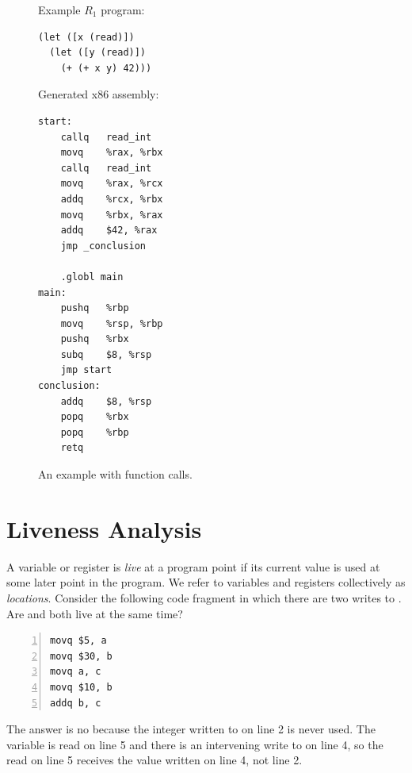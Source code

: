 \documentclass[11pt]{book}
\begin{document}
\begin{figure}[tp]
\begin{minipage}{0.45\textwidth}
Example $R_1$ program:
\begin{lstlisting}
(let ([x (read)])
  (let ([y (read)])
    (+ (+ x y) 42)))
\end{lstlisting}
\end{minipage}
\begin{minipage}{0.45\textwidth}
Generated x86 assembly:
\begin{lstlisting}
start:
	callq	read_int
	movq	%rax, %rbx
	callq	read_int
	movq	%rax, %rcx
	addq	%rcx, %rbx
	movq	%rbx, %rax
	addq	$42, %rax
	jmp _conclusion

	.globl main
main:
	pushq	%rbp
	movq	%rsp, %rbp
	pushq	%rbx
	subq	$8, %rsp
	jmp start
conclusion:
	addq	$8, %rsp
	popq	%rbx
	popq	%rbp
	retq
\end{lstlisting}
\end{minipage}
\caption{An example with function calls.}
  \label{fig:example-calling-conventions}
\end{figure}


\section{Liveness Analysis}
\label{sec:liveness-analysis-r1}

A variable or register is \emph{live} at a program point if its
current value is used at some later point in the program.  We 
refer to variables and registers collectively as \emph{locations}.
%
Consider the following code fragment in which there are two writes to
. Are  and  both live at the same time?
\begin{lstlisting}[numbers=left,numberstyle=\tiny]
movq $5, a
movq $30, b
movq a, c
movq $10, b
addq b, c
\end{lstlisting}
The answer is no because the integer  written to  on
line 2 is never used. The variable  is read on line 5 and
there is an intervening write to  on line 4, so the read on
line 5 receives the value written on line 4, not line 2.
\end{document}

